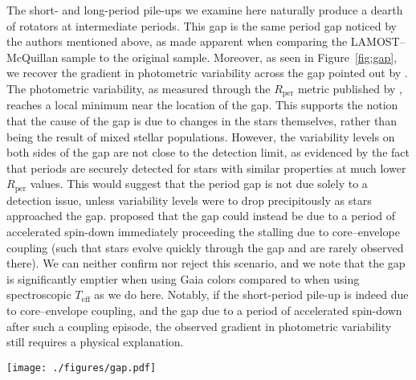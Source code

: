 \documentclass[linenumbers,trackchanges,twocolumn]{aastex631}
\newcommand{\lamostmcq}{LAMOST--McQuillan\xspace}
\newcommand{\teff}{\ensuremath{T_{\mathrm{eff}}}\xspace}
\newcommand{\prot}{\ensuremath{P_\mathrm{rot}}\xspace}
\newcommand{\rper}{\ensuremath{R_\mathrm{per}}\xspace}
\begin{document}
The short- and long-period pile-ups we examine here naturally produce a dearth of rotators at intermediate periods. This gap is the same period gap noticed by the authors mentioned above, as made apparent when comparing the \lamostmcq sample to the original \citet{McQuillan2014} sample. Moreover, as seen in Figure~\ref{fig:gap}, we recover the gradient in photometric variability across the gap pointed out by \citet{Reinhold2019}. The photometric variability, as measured through the \rper metric published by \citet{McQuillan2014}, reaches a local minimum near the location of the gap. This supports the notion that the cause of the gap is due to changes in the stars themselves, rather than being the result of mixed stellar populations. However, the variability levels on both sides of the gap are not close to the detection limit, as evidenced by the fact that periods are securely detected for stars with similar properties at much lower \rper values. This would suggest that the period gap is not due solely to a detection issue, unless variability levels were to drop precipitously as stars approached the gap. \citet{Gordon2021} proposed that the gap could instead be due to a period of accelerated spin-down immediately proceeding the stalling due to core–envelope coupling (such that stars evolve quickly through the gap and are rarely observed there). We can neither confirm nor reject this scenario, and we note that the gap is significantly emptier when using Gaia colors \citep{DavenportCovey2018, Gordon2021} compared to when using spectroscopic \teff as we do here. Notably, if the short-period pile-up is indeed due to core–envelope coupling, and the gap due to a period of accelerated spin-down after such a coupling episode, the observed gradient in photometric variability still requires a physical explanation.

\begin{figure*}
    \centering
    \texttt{[image: ./figures/gap.pdf]}
    \caption{The \teff--\prot distribution of the \lamostmcq (left) and \citet{McQuillan2014} samples color coded by the variability amplitude, \rper. Black contours show Gaussian kernel density estimation of the plotted distributions, and the dashed line shows a constant Rossby curve of Ro~=~0.5.
    The long- and short-period pile-ups are separated by a relative dearth of stars with intermediate rotation periods. A strong gradient in \rper is apparent across this gap, such that variability amplitude reaches a local minimum near the gap's center.}
    \label{fig:gap}
\end{figure*}
\end{document}

